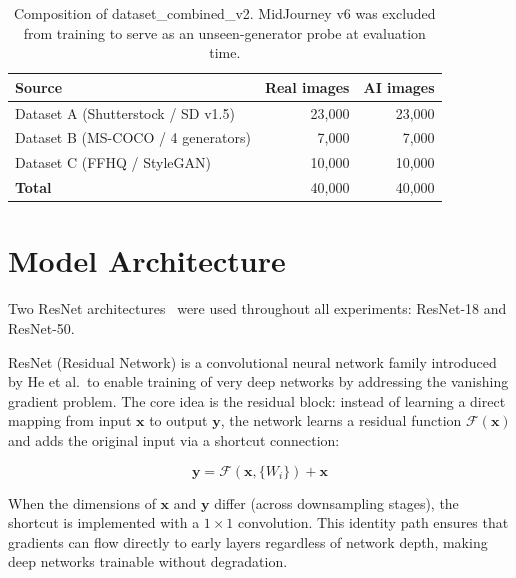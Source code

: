 \begin{table}[h!]
  \centering
  \caption{Composition of dataset\_combined\_v2. MidJourney v6 was excluded from training
           to serve as an unseen-generator probe at evaluation time.}
  \label{tab:combined_v2}
  \begin{tabular}{lrr}
    \hline
    \textbf{Source} & \textbf{Real images} & \textbf{AI images} \\
    \hline
    Dataset A (Shutterstock / SD v1.5)     & 23,000 & 23,000 \\
    Dataset B (MS-COCO / 4 generators)     & 7,000  & 7,000  \\
    Dataset C (FFHQ / StyleGAN)            & 10,000 & 10,000 \\
    \hline
    \textbf{Total}                          & 40,000 & 40,000 \\
    \hline
  \end{tabular}
\end{table}


\section{Model Architecture}
\label{sec:architecture}

Two ResNet architectures~\cite{he2016} were used throughout all experiments: ResNet-18 and
ResNet-50.

ResNet (Residual Network) is a convolutional neural network family introduced by He et al.\ to
enable training of very deep networks by addressing the vanishing gradient problem. The core idea
is the residual block: instead of learning a direct mapping from input $\mathbf{x}$ to output
$\mathbf{y}$, the network learns a residual function $\mathcal{F}(\mathbf{x})$ and adds the
original input via a shortcut connection:

\begin{equation}
  \mathbf{y} = \mathcal{F}(\mathbf{x}, \{W_i\}) + \mathbf{x}
  \label{eq:residual}
\end{equation}

When the dimensions of $\mathbf{x}$ and $\mathbf{y}$ differ (across downsampling stages), the
shortcut is implemented with a $1 \times 1$ convolution. This identity path ensures that
gradients can flow directly to early layers regardless of network depth, making deep networks
trainable without degradation.

